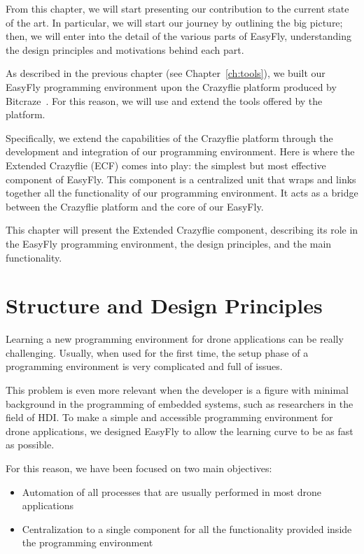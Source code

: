 From this chapter, we will start presenting our contribution to the current state of the art.
In particular, we will start our journey by outlining the big picture; then, we will enter into the detail of the various parts of EasyFly, understanding the design principles and motivations behind each part.

As described in the previous chapter (see Chapter~\ref{ch:tools}), we built our EasyFly programming environment upon the Crazyflie platform produced by Bitcraze~\cite{bitcraze}.
For this reason, we will use and extend the tools offered by the platform.

Specifically, we extend the capabilities of the Crazyflie platform through the development and integration of our programming environment.
Here is where the Extended Crazyflie (ECF) comes into play: the simplest but most effective component of EasyFly. 
This component is a centralized unit that wraps and links together all the functionality of our programming environment. 
It acts as a bridge between the Crazyflie platform and the core of our EasyFly.

This chapter will present the Extended Crazyflie component, describing its role in the EasyFly programming environment, the design principles, and the main functionality. 

\section{Structure and Design Principles}\label{sec:ecf_structure_design}

Learning a new programming environment for drone applications can be really challenging. 
Usually, when used for the first time, the setup phase of a programming environment is very complicated and full of issues.

This problem is even more relevant when the developer is a figure with minimal background in the programming of embedded systems, such as researchers in the field of HDI.
To make a simple and accessible programming environment for drone applications, we designed EasyFly to allow the learning curve to be as fast as possible.

For this reason, we have been focused on two main objectives:
\begin{itemize}
    \item Automation of all processes that are usually performed in most drone applications
    \item Centralization to a single component for all the functionality provided inside the programming environment
\end{itemize}

